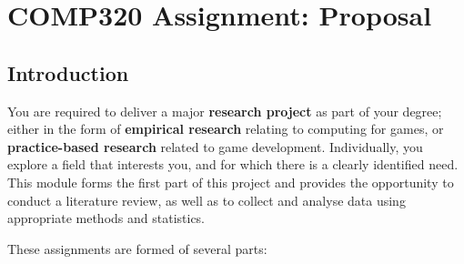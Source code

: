 \chapter{COMP320 Assignment: Proposal}

\section*{Introduction}

You are required to deliver a major \textbf{research project} as part of your degree; either in the form of \textbf{empirical research} relating to computing for games, or \textbf{practice-based research} related to game development. Individually, you explore a field that interests you, and for which there is a clearly identified need. This module forms the first part of this project and provides the opportunity to conduct a literature review, as well as to collect and analyse data using appropriate methods and statistics.

These assignments are formed of several parts:

